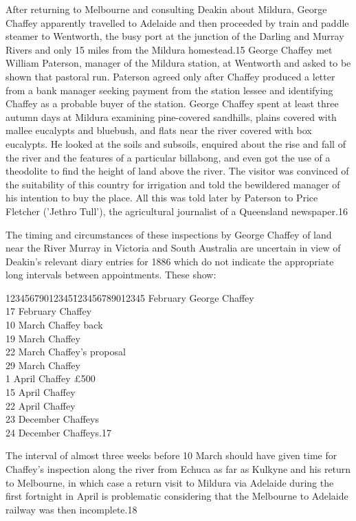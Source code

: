 After returning to Melbourne and consulting Deakin about Mildura,
George Chaffey apparently travelled to Adelaide and then proceeded by
train and paddle steamer to Wentworth, the busy port at the junction
of the Darling and Murray Rivers and only 15 miles from the Mildura
homestead.15 George Chaffey met William Paterson, manager of the
Mildura station, at Wentworth and asked to be shown that pastoral run.
Paterson agreed only after Chaffey produced a letter from a bank
manager seeking payment from the station lessee and identifying
Chaffey as a probable buyer of the station.  George Chaffey spent at
least three autumn days at Mildura examining pine-covered sandhills,
plains covered with mallee eucalypts and bluebush, and flats near the
river covered with box eucalypts.  He looked at the soils and
subsoils, enquired about the rise and fall of the river and the
features of a particular billabong, and even got the use of a
theodolite to find the height of land above the river.  The visitor
was convinced of the suitability of this country for irrigation and
told the bewildered manager of his intention to buy the place.  All
this was told later by Paterson to Price Fletcher ('Jethro Tull'), the
agricultural journalist of a Queensland newspaper.16

The timing and circumstances of these inspections by George Chaffey of
land near the River Murray in Victoria and South Australia are
uncertain in view of Deakin's relevant diary entries for 1886 which do
not indicate the appropriate long intervals between
appointments.  These show:
\begin{tabbing}
        12345679012345\=123456789012345 February \> George Chaffey\\
	17 February \> Chaffey\\
	10 March    \> Chaffey back\\
	19 March    \> Chaffey \\
	22 March    \> Chaffey's proposal \\
	29 March    \> Chaffey \\
	 1 April    \> Chaffey \pounds500 \\
	15 April    \> Chaffey \\
	22 April    \> Chaffey \\
	23 December \> Chaffeys \\
	24 December \> Chaffeys.17\\
\end{tabbing}
The interval of almost three weeks before 10 March should have given
time for Chaffey's inspection along the river from Echuca as far as
Kulkyne and his return to Melbourne, in which case a return visit to
Mildura via Adelaide during the first fortnight in April is
problematic considering that the Melbourne to Adelaide railway was
then incomplete.18

